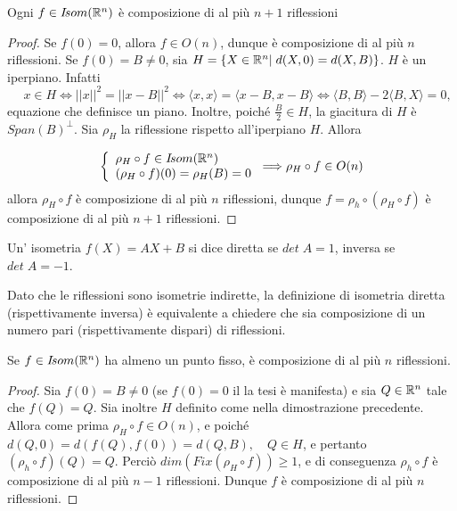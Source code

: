  
 \begin{theorem}
	Ogni $f\in I\!som( \mathbb R^n)$ è composizione di al più $n+1$ riflessioni
 \end{theorem}
 
 \begin{proof}
 Se $f(0)=0$, allora $f\in O(n)$, dunque è composizione di al più $n$ 
 riflessioni.
 Se $f(0)=B\ne 0$, sia $H=\{X\in \mathbb R^n|\;d(X,0)=d(X,B)\}$.
 $H$ è un iperpiano. Infatti 
 \[
  \quad x\in H\Longleftrightarrow ||x||^2=||x-B||^2\Longleftrightarrow\langle x,x\rangle=
 \langle x-B,x-B\rangle\Longleftrightarrow\langle B,B\rangle-2\langle B,X\rangle=0,
 \]
 equazione che definisce un piano. Inoltre, poiché $\frac{B}{2}\in H$, la giacitura di $H$ è $Span(B)^{\bot}$.
 Sia $\rho_H$ la riflessione rispetto all'iperpiano $H$. Allora
 
 \[ \left\{
 \begin{array}{l}
  \rho_H\circ f\in I\!som( \mathbb R^n) \\
  (\rho_H\circ f)(0)=\rho_H(B)=0
 \end{array}
 \right.
 \Longrightarrow \rho_H\circ f\in O(n)
 \]
 allora $\rho_H\circ f$ è composizione di al più $n$ riflessioni, dunque $f=\rho_h\circ(\rho_H\circ f)$
 è composizione di al più $n+1$ riflessioni.
 \end{proof}
 
 \begin{definition}
	Un' isometria $f(X)=AX+B$ si dice diretta se $det\; A=1$, inversa se $det\; A=-1$.
 \end{definition}
 
 \begin{remark}
	Dato che le riflessioni sono isometrie indirette, la definizione di isometria diretta (rispettivamente inversa)
	è equivalente a chiedere che sia composizione di un numero pari (rispettivamente dispari) di riflessioni.
 \end{remark}

 
 \begin{proposition}
 Se $f\in I\!som( \mathbb R^n)$ ha almeno un punto fisso, è composizione di al più $n$ riflessioni.
 \end{proposition}
 
 \begin{proof}
 Sia $f(0)=B\ne 0$ (se $f(0)=0$ il la tesi è manifesta) e sia $Q\in \mathbb R^n$ tale che $f(Q)=Q$. Sia inoltre $H$ definito
 come nella dimostrazione precedente. Allora come prima $\rho_H\circ f\in O(n)$, e poiché $d(Q,0)=d(f(Q),f(0))=d(Q,B),\quad Q\in H$,
 e pertanto $(\rho_h\circ f)(Q)=Q$. Perciò $dim(Fix(\rho_H\circ f))\ge 1$, e di conseguenza $\rho_h\circ f$
 è composizione di al più $n-1$ riflessioni. Dunque $f$ è composizione di al più $n$ riflessioni.
 \end{proof}

